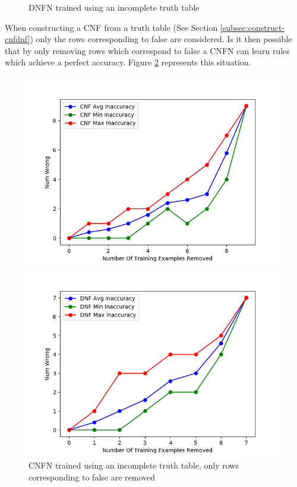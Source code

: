 \begin{figure}[H]
\begin{minipage}[b]{0.45\textwidth}
		\caption{DNFN trained using an incomplete truth table}
		\label{fig:dnf-descrete-generalizatiion}
	\end{minipage}
	\hfill
\end{figure}

When constructing a CNF from a truth table (See Section \ref{subsec:construct-cnfdnf}) only the rows corresponding to false are considered. Is it then possible that by only removing rows which correspond to false a CNFN can learn rules which achieve a perfect accuracy. Figure \ref{fig:cnf-descrete-generalizatiion-partial} represents this situation.

\begin{figure}[H]
	\centering
	\begin{minipage}[b]{0.45\textwidth}
		\includegraphics[width=\textwidth]{cnf-descrete-generalization-partial.png}
		\caption{CNFN trained using an incomplete truth table, only rows corresponding to false are removed}
		\label{fig:cnf-descrete-generalizatiion-partial}
	\end{minipage}
	\begin{minipage}[b]{0.45\textwidth}
		\includegraphics[width=\textwidth]{dnf-descrete-generalization-partial.png}

\end{minipage}
\end{figure}
